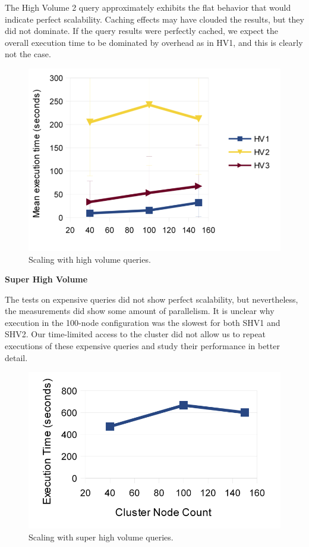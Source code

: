 \documentclass[DM,toc]{lsstdoc}
\begin{document}
The High Volume 2 query approximately exhibits the flat behavior that
would indicate perfect scalability. Caching effects may have clouded the
results, but they did not dominate. If the query results were perfectly
cached, we expect the overall execution time to be dominated by overhead
as in HV1, and this is clearly not the case.

\begin{figure}[H]
\centering
\includegraphics{_static/150_node_scaling_high_volume}
\caption{Scaling with high volume queries.}
\label{fig:150-node-scaling-high-volume}
\end{figure}

\textbf{Super High Volume}

The tests on expensive queries did not show perfect scalability, but
nevertheless, the measurements did show some amount of parallelism. It
is unclear why execution in the 100-node configuration was the slowest
for both SHV1 and SHV2. Our time-limited access to the cluster did not
allow us to repeat executions of these expensive queries and study their
performance in better detail.

\begin{figure}[H]
\centering
\includegraphics{_static/150_node_super_high_volume}
\caption{Scaling with super high volume queries.}
\end{figure}
\end{document}
